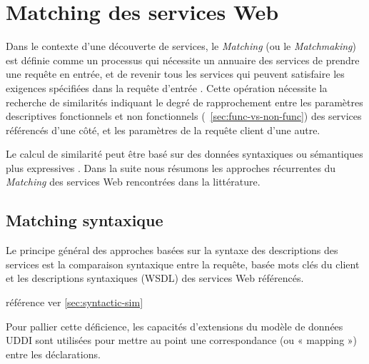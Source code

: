 \section{Matching des services Web}
\label{sec:ws-matching}
Dans le contexte d'une découverte de services, le \textit{Matching}
(ou le \textit{Matchmaking}) est définie comme un processus qui
nécessite un annuaire des services de prendre une requête en entrée,
et de revenir tous les services qui peuvent satisfaire les exigences
spécifiées dans la requête d'entrée \cite{li2004software}. Cette
opération nécessite la recherche de similarités indiquant le degré de
rapprochement entre les paramètres descriptives fonctionnels et
non fonctionnels (~\ref{sec:func-vs-non-func}) des services référencés
d'une côté, et les paramètres de la requête client d'une autre.

Le calcul de similarité peut être basé sur des données syntaxiques ou
sémantiques plus expressives \cite{elie2010}. Dans la suite nous
résumons les approches récurrentes du \textit{Matching} des services
Web rencontrées dans la littérature.

  \subsection{Matching syntaxique}
  \label{sec:matching-syntactique}
  {\color{red} Le principe général des approches basées sur la syntaxe
    des descriptions des services est la comparaison syntaxique entre
    la requête, basée mots clés du client et les descriptions
    syntaxiques (\textsc{WSDL}) des services Web
    référencés. \cite{chelbabi2012decouverte} 
    
    référence ver \ref{sec:syntactic-sim}
  }  


  {\color{red} 
    Pour pallier cette déficience, les capacités d’extensions du
    modèle de données UDDI sont utilisées pour mettre au point une
    correspondance (ou « mapping ») entre les déclarations.
  }

